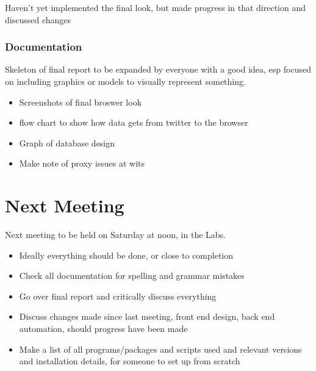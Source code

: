 \documentclass[11pt]{article}
\begin{document}
Haven't yet implemented the final look, but made progress in that direction and discussed changes

\subsubsection{Documentation}
Skeleton of final report to be expanded by everyone with a good idea, esp focused on including graphics or models to visually represent something.
\begin{itemize}
\item Screenshots of final broswer look
\item flow chart to show how data gets from twitter to the browser
\item Graph of database design
\item Make note of proxy issues at wits
\end{itemize}

\section{Next Meeting}
Next meeting to be held on Saturday at noon, in the Labs. 
\begin{itemize}
\item Ideally everything should be done, or close to completion
\item Check all documentation for spelling and grammar mistakes
\item Go over final report and critically discuss everything
\item Discuss changes made since last meeting, front end design, back end automation, should progress have been made
\item Make a list of all programs/packages and scripts used and relevant versions and installation details, for someone to set up from scratch
\end{itemize}
	
\end{document}
